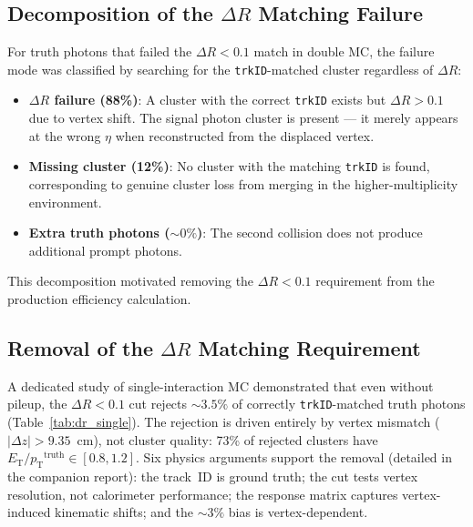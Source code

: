 \documentclass[11pt,a4paper]{article}
\newcommand{\ET}{\ensuremath{E_{\text{T}}}\xspace}
\newcommand{\pT}{\ensuremath{p_{\text{T}}}\xspace}
\newcommand{\DR}{\ensuremath{\Delta R}\xspace}
\begin{document}
\subsection{Decomposition of the \DR Matching Failure}
\label{subsec:eff_decomposition}

For truth photons that failed the $\DR < 0.1$ match in double MC, the failure
mode was classified by searching for the \texttt{trkID}-matched cluster
regardless of \DR:

\begin{itemize}
    \item \textbf{\DR failure (88\%)}: A cluster with the correct \texttt{trkID}
      exists but $\DR > 0.1$ due to vertex shift.
      The signal photon cluster is present --- it merely appears at the
      wrong $\eta$ when reconstructed from the displaced vertex.
    \item \textbf{Missing cluster (12\%)}: No cluster with the matching
      \texttt{trkID} is found, corresponding to genuine cluster loss from merging
      in the higher-multiplicity environment.
    \item \textbf{Extra truth photons (${\sim}0\%$)}: The second collision does
      not produce additional prompt photons.
\end{itemize}

This decomposition motivated removing the $\DR < 0.1$ requirement from the
production efficiency calculation.

\subsection{Removal of the \DR Matching Requirement}
\label{subsec:dr_removal}

A dedicated study of single-interaction MC demonstrated that even without pileup,
the $\DR < 0.1$ cut rejects ${\sim}3.5\%$ of correctly \texttt{trkID}-matched
truth photons (Table~\ref{tab:dr_single}).
The rejection is driven entirely by vertex mismatch ($|\Delta z| > 9.35$~cm), not
cluster quality: 73\% of rejected clusters have $\ET / \pT^{\text{truth}} \in
[0.8, 1.2]$.
Six physics arguments support the removal (detailed in the companion report):
the track~ID is ground truth; the cut tests vertex resolution, not calorimeter
performance; the response matrix captures vertex-induced kinematic shifts; and
the ${\sim}3\%$ bias is vertex-dependent.
\end{document}
